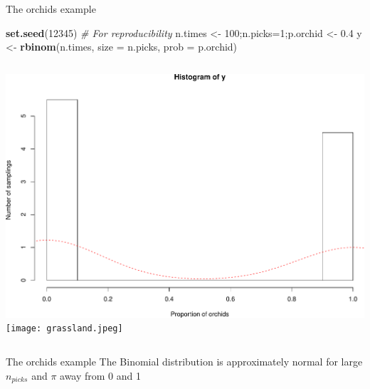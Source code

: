 \documentclass[
  ignorenonframetext,
]{beamer}
\newenvironment{Shaded}{\begin{snugshade}}{\end{snugshade}}
\newcommand{\AttributeTok}[1]{\textcolor[rgb]{0.13,0.29,0.53}{#1}}
\newcommand{\CommentTok}[1]{\textcolor[rgb]{0.56,0.35,0.01}{\textit{#1}}}
\newcommand{\DecValTok}[1]{\textcolor[rgb]{0.00,0.00,0.81}{#1}}
\newcommand{\FloatTok}[1]{\textcolor[rgb]{0.00,0.00,0.81}{#1}}
\newcommand{\FunctionTok}[1]{\textcolor[rgb]{0.13,0.29,0.53}{\textbf{#1}}}
\newcommand{\NormalTok}[1]{#1}
\newcommand{\OtherTok}[1]{\textcolor[rgb]{0.56,0.35,0.01}{#1}}
\newcommand{\columnsbegin}{\begin{columns}}
\newcommand{\columnsend}{\end{columns}}
\begin{document}
\begin{frame}[fragile]{The orchids example}
\protect\hypertarget{the-orchids-example-1}{}
\begin{codebox}

\begin{Shaded}
\begin{Highlighting}[]
\FunctionTok{set.seed}\NormalTok{(}\DecValTok{12345}\NormalTok{) }\CommentTok{\# For reproducibility}
\NormalTok{n.times }\OtherTok{\textless{}{-}} \DecValTok{100}\NormalTok{;n.picks}\OtherTok{=}\DecValTok{1}\NormalTok{;p.orchid }\OtherTok{\textless{}{-}} \FloatTok{0.4}
\NormalTok{y }\OtherTok{\textless{}{-}} \FunctionTok{rbinom}\NormalTok{(n.times, }\AttributeTok{size =}\NormalTok{ n.picks, }\AttributeTok{prob =}\NormalTok{ p.orchid) }
\end{Highlighting}
\end{Shaded}

\end{codebox}

\columnsbegin
{}

\includegraphics{IntroLM_files/figure-beamer/unnamed-chunk-4-1.pdf}
 \texttt{[image: grassland.jpeg]} \columnsend
\end{frame}

\begin{frame}{The orchids example}
\protect\hypertarget{the-orchids-example-2}{}
The Binomial distribution is approximately normal for large
\(n_{picks}\) and \(\pi\) away from 0 and 1
\end{frame}
\end{document}
